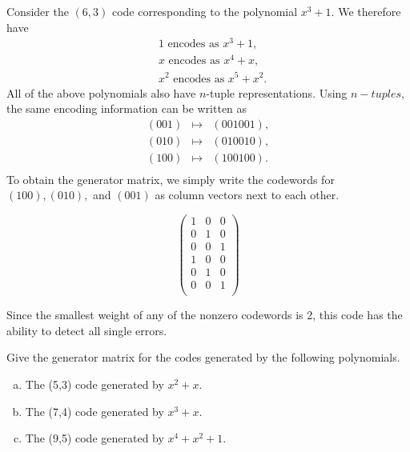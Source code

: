 \begin {example}{}
Consider the $(6,3)$ code corresponding to the polynomial $x^3+1$.  We therefore have
\begin{align*}
&1 \text{~encodes as~}x^3+1,\\
&x \text{~encodes as~}x^4+x,\\
&x^2 \text{~encodes as~}x^5+x^2.
\end{align*}
All of the above polynomials also have $n$-tuple representations.  Using $n-tuples$, the same encoding information can be written as
\[
\begin{array}{rcl}
(001) & \mapsto & (001001),  \\
(010) & \mapsto & (010010) , \\
(100) & \mapsto & (100100). \\
\end{array}
\]
To obtain the generator matrix, we simply write the codewords for $(100), (010),$ and $(001)$ as column vectors next to each other.

\[\begin{pmatrix} 
1 & 0 & 0\\
0 & 1 & 0\\
0 & 0 & 1\\
1 & 0 & 0\\
0 & 1 & 0\\
0 & 0 & 1\\
\end{pmatrix}\]

Since the smallest weight of any of the nonzero codewords is 2, this code has the ability to detect all single errors.  

\end {example}

\begin {exercise}{}
Give the generator matrix for the codes generated by the following polynomials.
\begin {enumerate}[(a)]
\item The (5,3) code generated by $x^2 + x$.
\item The (7,4) code generated by $x^3 + x $.
\item The (9,5) code generated by $x^4 + x^2 + 1$.
\end {enumerate}
\end {exercise}

